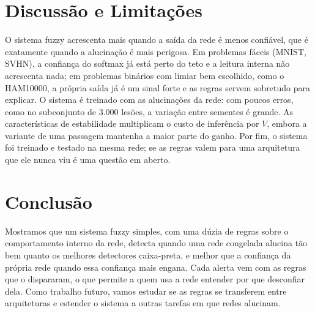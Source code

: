 \section{Discussão e Limitações}
O sistema fuzzy acrescenta mais quando a saída da rede é menos confiável, que é exatamente quando a alucinação é mais perigosa. Em problemas
fáceis (MNIST, SVHN), a confiança do softmax já está perto do teto e a leitura interna não acrescenta nada; em problemas binários com limiar
bem escolhido, como o HAM10000, a própria saída já é um sinal forte e as regras servem sobretudo para explicar.
O sistema é treinado com as alucinações da rede: com poucos erros, como no subconjunto de 3.000 lesões, a variação entre sementes é grande.
As características de estabilidade multiplicam o custo de inferência por $V$, embora a variante de uma passagem mantenha a maior parte do ganho.
Por fim, o sistema foi treinado e testado na mesma rede; se as regras valem para uma arquitetura que ele nunca viu é uma questão em aberto.

\section{Conclusão}
Mostramos que um sistema fuzzy simples, com uma dúzia de regras sobre o comportamento interno da rede, detecta quando uma rede congelada
alucina tão bem quanto os melhores detectores caixa-preta, e melhor que a confiança da própria rede quando essa confiança mais engana.
Cada alerta vem com as regras que o dispararam, o que permite a quem usa a rede entender por que desconfiar dela.
Como trabalho futuro, vamos estudar se as regras se transferem entre arquiteturas e estender o sistema a outras tarefas em que redes alucinam.






